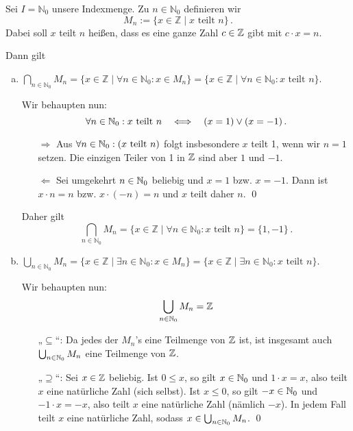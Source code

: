 \begin{bsp}
	Sei $I=\mathbb{N}_0$ unsere Indexmenge. Zu $n\in\mathbb{N}_0$ definieren wir
	\[ M_n := \{ x\in\mathbb{Z} \mid x\text{ teilt } n \} \,.\]
	Dabei soll $x$ teilt $n$ heißen, dass es eine ganze Zahl $c\in{\mathbb Z}$ gibt mit $c\cdot x=n$.
	
	Dann gilt 
	\begin{enumerate}[a)]
		 \item $\bigcap_{n\in\mathbb{N}_0} M_n= \{x\in \mathbb{Z} \mid \forall n\in \mathbb{N}_0:x\in M_n\}= \{x\in \mathbb{Z} \mid \forall n\in \mathbb{N}_0: x\text{ teilt }n\}$.
		 
		 Wir behaupten nun:
		 	\[\forall n\in{\mathbb N}_0:x\text{ teilt }n \quad\Longleftrightarrow\quad (x=1)\vee (x=-1) \,.\]
\begin{bew}	
			 \begin{itemize}
			 	\item[\glqq$\Rightarrow$\grqq] Aus $\forall n\in{\mathbb N}_0:(x\text{ teilt }n )$ folgt insbesondere $x$ teilt 1, wenn wir $n=1$ setzen. Die einzigen Teiler von 1 in ${\mathbb Z}$ sind aber $1$ und $-1$.
			 	\item[\glqq$\Leftarrow$\grqq] Sei umgekehrt $n\in{\mathbb N}_0$ beliebig und $x=1$ bzw. $x=-1$. Dann ist $x\cdot n=n$ bzw. $x\cdot (-n)=n$ und $x$ teilt daher $n$. \qed
			 \end{itemize}
\end{bew}
		 Daher gilt 
		 	$$\bigcap_{n\in\mathbb{N}_0} M_n=\{x\in \mathbb{Z} \mid \forall n\in \mathbb{N}_0: x\text{ teilt }n\}=\{1,-1\}\,.$$
		 \item $\bigcup_{n\in\mathbb{N}_0} M_n= \{x\in \mathbb{Z} \mid \exists n\in \mathbb{N}_0:x\in M_n\}= \{x\in \mathbb{Z} \mid \exists n\in \mathbb{N}_0: x\text{ teilt }n\}$.
		 
		  Wir behaupten nun:
		 \[\bigcup_{n\in\mathbb{N}_0} M_n = {\mathbb Z}\]
    \begin{bew} \begin{itemize}
                 \item[„$\subseteq$“:] Da jedes der $M_n$'s eine Teilmenge von ${\mathbb Z}$ ist, ist insgesamt auch $\bigcup_{n\in {\mathbb N}_0} M_n$ eine Teilmenge von ${\mathbb Z}$.
                 \item[„$\supseteq$“:] Sei $x\in{\mathbb Z}$ beliebig. Ist $0\leq x$, so gilt $x\in{\mathbb N}_0$ und $1\cdot x=x$, also teilt $x$ eine natürliche Zahl (sich selbst). Ist $x\leq 0$, so gilt $-x\in{\mathbb N}_0$ und $-1\cdot x= -x$, also teilt $x$ eine natürliche Zahl (nämlich $-x$). In jedem Fall teilt $x$ eine natürliche Zahl, sodass $x\in \bigcup_{n\in {\mathbb N}_0} M_n$. \qed
                \end{itemize}
\end{bew}
	\end{enumerate}
\end{bsp}







